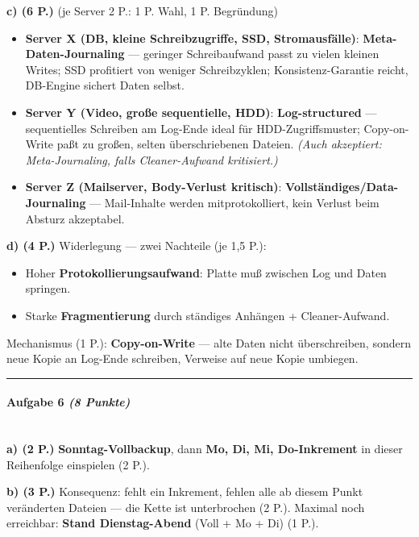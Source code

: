 \documentclass[11pt, a4paper]{article}
\begin{document}
\textbf{c) (6 P.)} (je Server 2 P.: 1 P. Wahl, 1 P. Begründung)

\begin{itemize}
  \item \textbf{Server X (DB, kleine Schreibzugriffe, SSD, Stromausfälle)}: \textbf{Meta-Daten-Journaling} — geringer Schreibaufwand passt zu vielen kleinen Writes; SSD profitiert von weniger Schreibzyklen; Konsistenz-Garantie reicht, DB-Engine sichert Daten selbst.
  \item \textbf{Server Y (Video, große sequentielle, HDD)}: \textbf{Log-structured} — sequentielles Schreiben am Log-Ende ideal für HDD-Zugriffsmuster; Copy-on-Write paßt zu großen, selten überschriebenen Dateien. \textit{(Auch akzeptiert: Meta-Journaling, falls Cleaner-Aufwand kritisiert.)}
  \item \textbf{Server Z (Mailserver, Body-Verlust kritisch)}: \textbf{Vollständiges/Data-Journaling} — Mail-Inhalte werden mitprotokolliert, kein Verlust beim Absturz akzeptabel.
\end{itemize}

\textbf{d) (4 P.)} Widerlegung — zwei Nachteile (je 1,5 P.):

\begin{itemize}
  \item Hoher \textbf{Protokollierungsaufwand}: Platte muß zwischen Log und Daten springen.
  \item Starke \textbf{Fragmentierung} durch ständiges Anhängen + Cleaner-Aufwand.
\end{itemize}
Mechanismus (1 P.): \textbf{Copy-on-Write} — alte Daten nicht überschreiben, sondern neue Kopie an Log-Ende schreiben, Verweise auf neue Kopie umbiegen.



\noindent\textcolor{rulegray}{\rule{\linewidth}{0.4pt}}


\paragraph{Aufgabe 6 \textit{(8 Punkte)}}\mbox{}\\[2pt]

\textbf{a) (2 P.)} \textbf{Sonntag-Vollbackup}, dann \textbf{Mo, Di, Mi, Do-Inkrement} in dieser Reihenfolge einspielen (2 P.).


\textbf{b) (3 P.)} Konsequenz: fehlt ein Inkrement, fehlen alle ab diesem Punkt veränderten Dateien — die Kette ist unterbrochen (2 P.). Maximal noch erreichbar: \textbf{Stand Dienstag-Abend} (Voll + Mo + Di) (1 P.).
\end{document}

